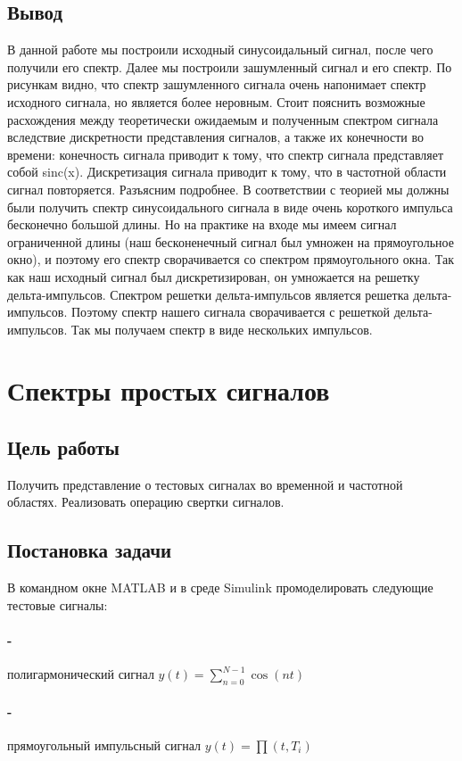 \documentclass[10pt,a4paper]{article}
\begin{document}
\subsection{Вывод}
В данной работе мы построили исходный синусоидальный сигнал, после чего получили его спектр. Далее мы построили зашумленный сигнал и его спектр. По рисункам видно, что спектр зашумленного сигнала очень напонимает спектр исходного сигнала, но является более неровным.
Стоит пояснить возможные расхождения между теоретически ожидаемым и полученным спектром сигнала вследствие дискретности представления сигналов, а также их конечности во времени: конечность сигнала приводит к тому, что спектр сигнала представляет собой sinc(x). Дискретизация сигнала приводит к тому, что в частотной области сигнал повторяется. Разъясним подробнее. В соответствии с теорией мы должны были получить спектр синусоидального сигнала в виде очень короткого импульса бесконечно большой длины. Но на практике на входе мы имеем сигнал ограниченной длины (наш бесконенечный сигнал был умножен на прямоугольное окно), и поэтому его спектр сворачивается со спектром прямоугольного окна.
Так как наш исходный сигнал был дискретизирован, он умножается на решетку дельта-импульсов. Спектром решетки дельта-импульсов является решетка дельта-импульсов. Поэтому спектр нашего сигнала сворачивается с решеткой дельта-импульсов. Так мы получаем спектр в виде нескольких импульсов.

\section{Спектры простых сигналов}
\subsection{Цель работы}
Получить представление о тестовых сигналах во временной и частотной областях. Реализовать операцию свертки сигналов.
\subsection{Постановка задачи}
В командном окне MATLAB и в среде Simulink промоделировать следующие тестовые сигналы:
\paragraph*{-}полигармонический сигнал $y(t)=\sum_{n=0}^{N-1}\cos(nt)$
\paragraph*{-}прямоугольный импульсный сигнал $y(t)=\prod(t,T_i)$
\end{document}
